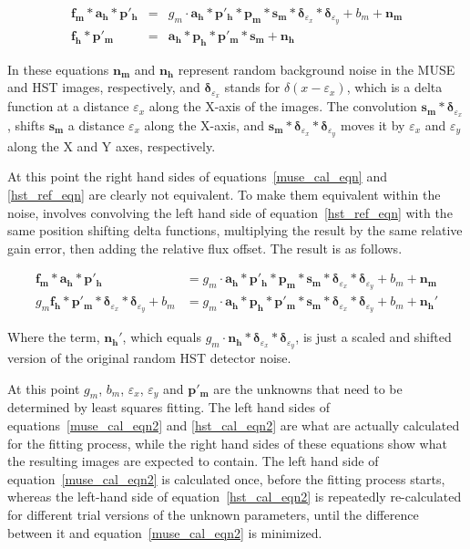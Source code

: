 \documentclass[12pt,twoside,a4paper]{article}
\newcommand{\msky}{\mathbf{s_m}}
\newcommand{\mpsf}{\mathbf{p_m}}
\newcommand{\hpsf}{\mathbf{p_h}}
\newcommand{\mepsf}{\mathbf{p'_m}}
\newcommand{\hepsf}{\mathbf{p'_h}}
\newcommand{\hlpf}{\mathbf{a_h}}
\newcommand{\mimg}{\mathbf{f_m}}
\newcommand{\himg}{\mathbf{f_h}}
\newcommand{\mnoise}{\mathbf{n_m}}
\newcommand{\hnoise}{\mathbf{n_h}}
\newcommand{\mdx}{\bm{\delta}_{\dx}}
\newcommand{\mdy}{\bm{\delta}_{\dy}}
\newcommand{\dx}{\varepsilon_x}
\newcommand{\dy}{\varepsilon_y}
\newcommand{\mgain}{g_m}
\newcommand{\mbg}{b_m}
\begin{document}
\begin{eqnarray}
\label{muse_cal_eqn}
\mimg \ast \hlpf \ast \hepsf &=& \mgain
\cdot \hlpf \ast \hepsf \ast \mpsf \ast \msky \ast \mdx \ast \mdy +
\mbg+\mnoise\\
\label{hst_ref_eqn}
\himg \ast \mepsf &=& \hlpf \ast \hpsf \ast \mepsf \ast \msky + \hnoise
\end{eqnarray}

In these equations $\mnoise$ and $\hnoise$ represent random background
noise in the MUSE and HST images, respectively, and $\mdx$ stands for
$\delta(x-\dx)$, which is a delta function at a distance $\dx$ along
the X-axis of the images. The convolution $\msky\ast\mdx$, shifts
$\msky$ a distance $\dx$ along the X-axis, and
$\msky\ast\mdx\ast\mdy$ moves it by $\dx$ and $\dy$ along the X and Y
axes, respectively.

At this point the right hand sides of equations~\ref{muse_cal_eqn} and
\ref{hst_ref_eqn} are clearly not equivalent. To make them equivalent
within the noise, involves convolving the left hand side of
equation~\ref{hst_ref_eqn} with the same position shifting delta
functions, multiplying the result by the same relative gain error,
then adding the relative flux offset. The result is as follows.

\begin{align}
\label{muse_cal_eqn2}
\mimg \ast \hlpf \ast \hepsf
&= \mgain \cdot \hlpf \ast \hepsf \ast \mpsf \ast \msky \ast \mdx \ast \mdy + \mbg+\mnoise\\
\label{hst_cal_eqn2}
\mgain \himg \ast \mepsf \ast \mdx \ast \mdy + \mbg
&= \mgain \cdot \hlpf \ast \hpsf \ast \mepsf \ast \msky \ast \mdx \ast \mdy + \mbg + \hnoise'
\end{align}

Where the term, $\hnoise'$, which equals
$\mgain\cdot\hnoise\ast\mdx\ast\mdy$, is just a scaled and shifted
version of the original random HST detector noise.

At this point $\mgain$, $\mbg$, $\dx$, $\dy$ and $\mepsf$ are the
unknowns that need to be determined by least squares fitting. The left
hand sides of equations~\ref{muse_cal_eqn2} and \ref{hst_cal_eqn2} are
what are actually calculated for the fitting process, while the right
hand sides of these equations show what the resulting images are
expected to contain. The left hand side of
equation~\ref{muse_cal_eqn2} is calculated once, before the fitting
process starts, whereas the left-hand side of
equation~\ref{hst_cal_eqn2} is repeatedly re-calculated for different
trial versions of the unknown parameters, until the difference between
it and equation~\ref{muse_cal_eqn2} is minimized.
\end{document}
